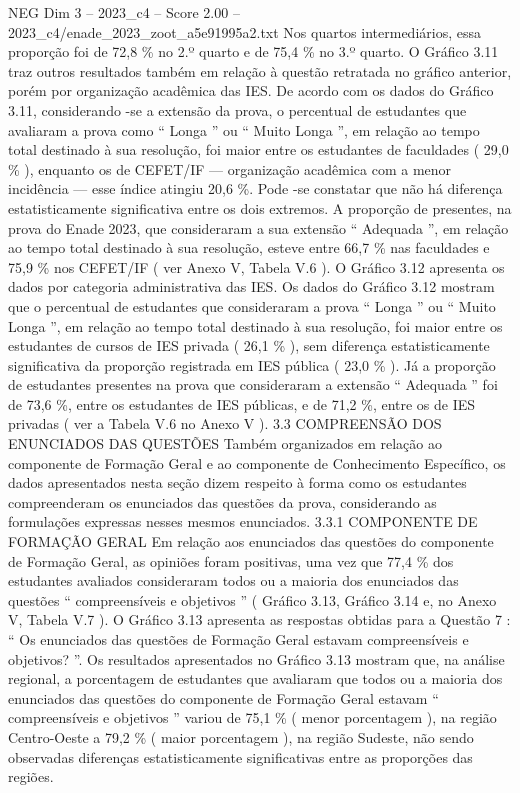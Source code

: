 \begin{textsample}{NEG Dim 3 – 2023\_c4 – Score 2.00 – 2023\_c4/enade\_2023\_zoot\_a5e91995a2.txt}
Nos quartos intermediários, essa proporção foi de 72,8 \% no 2.º quarto e de 75,4 \% no 3.º quarto.
O Gráfico 3.11 traz outros resultados também em relação à questão retratada no gráfico anterior, porém por organização acadêmica das IES.
De acordo com os dados do Gráfico 3.11, considerando -se a extensão da prova, o percentual de estudantes que avaliaram a prova como “ Longa ” ou “ Muito Longa ”, em relação ao tempo total destinado à sua resolução, foi maior entre os estudantes de faculdades ( 29,0 \% ), enquanto os de CEFET/IF — organização acadêmica com a menor incidência — esse índice atingiu 20,6 \%.
Pode -se constatar que não há diferença estatisticamente significativa entre os dois extremos.
A proporção de presentes, na prova do Enade 2023, que consideraram a sua extensão “ Adequada ”, em relação ao tempo total destinado à sua resolução, esteve entre 66,7 \% nas faculdades e 75,9 \% nos CEFET/IF ( ver Anexo V, Tabela V.6 ).
O Gráfico 3.12 apresenta os dados por categoria administrativa das IES.
Os dados do Gráfico 3.12 mostram que o percentual de estudantes que consideraram a prova “ Longa ” ou “ Muito Longa ”, em relação ao tempo total destinado à sua resolução, foi maior entre os estudantes de cursos de IES privada ( 26,1 \% ), sem diferença estatisticamente significativa da proporção registrada em IES pública ( 23,0 \% ).
Já a proporção de estudantes presentes na prova que consideraram a extensão “ Adequada ” foi de 73,6 \%, entre os estudantes de IES públicas, e de 71,2 \%, entre os de IES privadas ( ver a Tabela V.6 no Anexo V ). 3.3 COMPREENSÃO DOS ENUNCIADOS DAS QUESTÕES Também organizados em relação ao componente de Formação Geral e ao componente de Conhecimento Específico, os dados apresentados nesta seção dizem respeito à forma como os estudantes compreenderam os enunciados das questões da prova, considerando as formulações expressas nesses mesmos enunciados. 3.3.1 COMPONENTE DE FORMAÇÃO GERAL Em relação aos enunciados das questões do componente de Formação Geral, as opiniões foram positivas, uma vez que 77,4 \% dos estudantes avaliados consideraram todos ou a maioria dos enunciados das questões “ compreensíveis e objetivos ” ( Gráfico 3.13, Gráfico 3.14 e, no Anexo V, Tabela V.7 ).
O Gráfico 3.13 apresenta as respostas obtidas para a Questão 7 : “ Os enunciados das questões de Formação Geral estavam compreensíveis e objetivos? ”.
Os resultados apresentados no Gráfico 3.13 mostram que, na análise regional, a porcentagem de estudantes que avaliaram que todos ou a maioria dos enunciados das questões do componente de Formação Geral estavam “ compreensíveis e objetivos ” variou de 75,1 \% ( menor porcentagem ), na região Centro-Oeste a 79,2 \% ( maior porcentagem ), na região Sudeste, não sendo observadas diferenças estatisticamente significativas entre as proporções das regiões.

\end{textsample}
